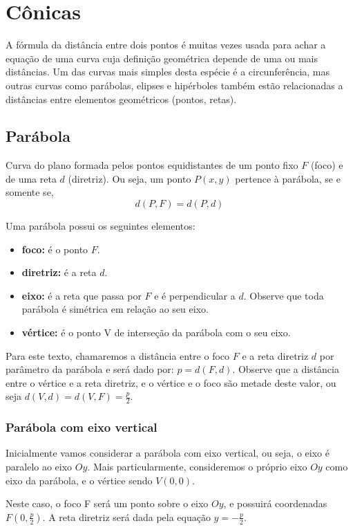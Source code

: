 \chapter{Cônicas}

A fórmula da distância entre dois pontos é muitas vezes usada para achar a equação de uma curva cuja definição geométrica depende de uma ou mais distâncias. Um das curvas mais simples desta espécie é a circunferência, mas outras curvas como parábolas, elipses e hipérboles também estão relacionadas a distâncias entre elementos geométricos (pontos, retas).

\section{Parábola}
Curva do plano formada pelos pontos equidistantes de um ponto fixo $F$ (foco) e de uma reta $d$ (diretriz). Ou seja, um ponto $P(x, y)$ pertence à parábola, se e somente se, $$d(P, F)=d(P, d)$$

Uma parábola possui os seguintes elementos:
\begin{itemize}
  \item \textbf{foco:} é o ponto $F$.
  \item \textbf{diretriz:} é a reta $d$.
  \item \textbf{eixo:} é a reta que passa por $F$ e é perpendicular a $d$. Observe que toda parábola é simétrica em relação ao seu eixo.
  \item \textbf{vértice:} é o ponto V de interseção da parábola com o seu eixo.
\end{itemize}

Para este texto, chamaremos a distância entre o foco $F$ e a reta diretriz $d$ por parâmetro da parábola e será dado por: $p=d(F, d)$. Observe que a distância entre o vértice e a reta diretriz, e o vértice e o foco são metade deste valor, ou seja $\displaystyle d(V, d)=d(V, F)= \frac{p}{2}$.

\subsection{Parábola com eixo vertical}

Inicialmente vamos considerar a parábola com eixo vertical, ou seja, o eixo é paralelo ao eixo $Oy$. Mais particularmente, consideremos o próprio eixo $Oy$ como eixo da parábola, e o vértice sendo $V(0, 0)$.

Neste caso, o foco F será um ponto sobre o eixo $Oy$, e possuirá coordenadas $\displaystyle F(0, \frac{p}{2})$. A reta diretriz será dada pela equação $y=-\frac{p}{2}$.

